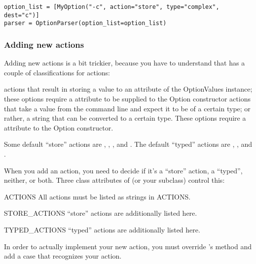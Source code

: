 \begin{verbatim}
option_list = [MyOption("-c", action="store", type="complex", dest="c")]
parser = OptionParser(option_list=option_list)
\end{verbatim}

\subsubsection{Adding new actions\label{optparse-adding-actions}}

Adding new actions is a bit trickier, because you have to understand
that  has a couple of classifications for actions:

\begin{definitions}
    actions that result in  storing a value to an attribute
    of the OptionValues instance; these options require a 
    attribute to be supplied to the Option constructor
    actions that take a value from the command line and expect it to be
    of a certain type; or rather, a string that can be converted to a
    certain type.  These options require a  attribute to the
    Option constructor.
\end{definitions}

Some default ``store'' actions are , ,
, and . The default ``typed'' actions are
, , and .

When you add an action, you need to decide if it's a ``store'' action,
a ``typed'', neither, or both.  Three class attributes of
 (or your  subclass) control this:

\begin{memberdesc}{ACTIONS}
    All actions must be listed as strings in ACTIONS.
\end{memberdesc}
\begin{memberdesc}{STORE_ACTIONS}
    ``store'' actions are additionally listed here.
\end{memberdesc}
\begin{memberdesc}{TYPED_ACTIONS}
    ``typed'' actions are additionally listed here.
\end{memberdesc}

In order to actually implement your new action, you must override
's  method and add a case that
recognizes your action.

